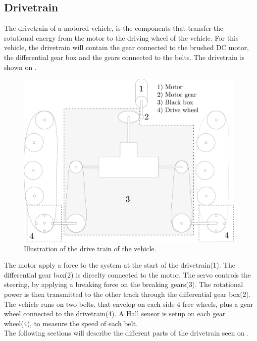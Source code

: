 \subsection{Drivetrain}
The drivetrain of a motored vehicle, is the components that transfer the rotational energy from the motor to the driving wheel of the vehicle. For this vehicle, the drivetrain will contain the gear connected to the brushed DC motor, the differential gear box and the gears connected to the belts. The drivetrain is shown on .

\begin{figure}[H]
	\centering
	\includegraphics[scale=0.2]{figures/vehicleDescriptionDriveTrain.pdf}
	\caption{Illustration of the drive train of the vehicle.}
	\label{vehicleDescriptionDriveTrain}
\end{figure}

The motor apply a force to the system at the start of the drivetrain(1). The differential gear box(2) is direclty connected to the motor. The servo controls the steering, by applying a breaking force on the breaking gears(3). The rotational power is then transmitted to the other track through the differential gear box(2). The vehicle runs on two belts, that envelop on each side 4 free wheels, plus a gear wheel connected to the drivetrain(4). A Hall sensor is setup on each gear wheel(4), to measure the speed of each belt.\\
The following sections will describe the different parts of the drivetrain seen on .\\
